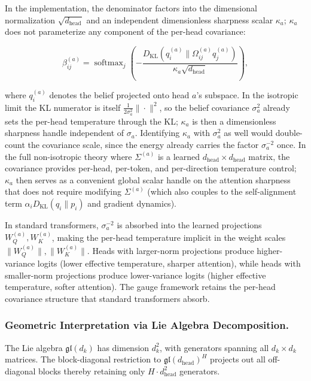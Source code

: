 \documentclass[twoside,11pt]{article}
\begin{document}
In the implementation, the denominator factors into the dimensional normalization $\sqrt{d_{\text{head}}}$ and an independent dimensionless sharpness scalar $\kappa_a$; $\kappa_a$ does not parameterize any component of the per-head covariance:

\begin{equation}
\beta_{ij}^{(a)} = \operatorname{softmax}_j \left(-\frac{D_{\mathrm{KL}}(q_i^{(a)} \| \Omega_{ij}^{(a)} q_j^{(a)})}{\kappa_a \sqrt{d_{\text{head}}}}\right),
\label{eq:per_head_temperature}
\end{equation}

where $q_i^{(a)}$ denotes the belief projected onto head $a$'s subspace. In the isotropic limit the KL numerator is itself $\frac{1}{2\sigma_a^2}\|\cdot\|^2$, so the belief covariance $\sigma_a^2$ already sets the per-head temperature through the KL; $\kappa_a$ is then a dimensionless sharpness handle independent of $\sigma_a$. Identifying $\kappa_a$ with $\sigma_a^2$ as well would double-count the covariance scale, since the energy already carries the factor $\sigma_a^{-2}$ once. In the full non-isotropic theory where $\Sigma^{(a)}$ is a learned $d_{\text{head}} \times d_{\text{head}}$ matrix, the covariance provides per-head, per-token, and per-direction temperature control; $\kappa_a$ then serves as a convenient global scalar handle on the attention sharpness that does not require modifying $\Sigma^{(a)}$ (which also couples to the self-alignment term $\alpha_i D_{\mathrm{KL}}(q_i \| p_i)$ and gradient dynamics).

In standard transformers, $\sigma_a^{-2}$ is absorbed into the learned projections $W_Q^{(a)}, W_K^{(a)}$, making the per-head temperature implicit in the weight scales $\|W_Q^{(a)}\|, \|W_K^{(a)}\|$. Heads with larger-norm projections produce higher-variance logits (lower effective temperature, sharper attention), while heads with smaller-norm projections produce lower-variance logits (higher effective temperature, softer attention). The gauge framework retains the per-head covariance structure that standard transformers absorb.

\subsubsection{Geometric Interpretation via Lie Algebra Decomposition.}

The Lie algebra $\mathfrak{gl}(d_k)$ has dimension $d_k^2$, with generators spanning all $d_k \times d_k$ matrices. The block-diagonal restriction to $\mathfrak{gl}(d_{\text{head}})^H$ projects out all off-diagonal blocks thereby retaining only $H \cdot d_{\text{head}}^2$ generators.
\end{document}
